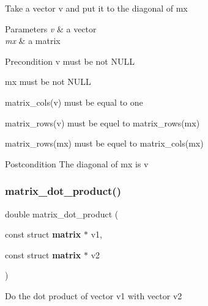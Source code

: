 Take a vector {\ttfamily v} and put it to the diagonal of {\ttfamily mx}


\begin{DoxyParams}{Parameters}
{\em v} & a vector \\
\hline
{\em mx} & a matrix\\
\hline
\end{DoxyParams}
\begin{DoxyPrecond}{Precondition}
{\ttfamily v} must be not N\+U\+LL 

{\ttfamily mx} must be not N\+U\+LL 

{\ttfamily matrix\+\_\+cols(v)} must be equal to one 

{\ttfamily matrix\+\_\+rows(v)} must be equel to {\ttfamily matrix\+\_\+rows(mx)} 

{\ttfamily matrix\+\_\+rows(mx)} must be equel to {\ttfamily matrix\+\_\+cols(mx)}
\end{DoxyPrecond}
\begin{DoxyPostcond}{Postcondition}
The diagonal of {\ttfamily mx} is {\ttfamily v} 
\end{DoxyPostcond}
\mbox{\label{matrix_8c_a7ba7365201acc5889936e1836d14cc8b}} 
\subsubsection{matrix\+\_\+dot\+\_\+product()}
{\footnotesize\ttfamily double matrix\+\_\+dot\+\_\+product (\begin{DoxyParamCaption}\item[{const struct \textbf{ matrix} $\ast$}]{v1,  }\item[{const struct \textbf{ matrix} $\ast$}]{v2 }\end{DoxyParamCaption})}

Do the dot product of vector {\ttfamily v1} with vector {\ttfamily v2}


